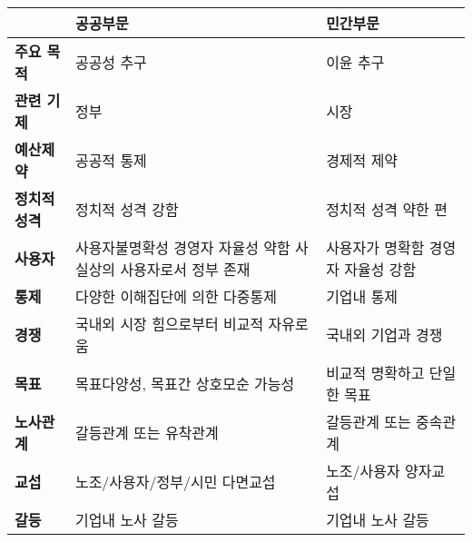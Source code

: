 \begin{tabular}{lp{8cm}p{8cm}}
\toprule
& \textbf{공공부문} & \textbf{민간부문} \\
\midrule
\textbf{주요 목적} & 공공성 추구 & 이윤 추구 \\
\midrule
\textbf{관련 기제} & 정부 & 시장 \\
\midrule
\textbf{예산제약} & 공공적 통제 & 경제적 제약 \\
\midrule
\textbf{정치적 성격} & 정치적 성격 강함 & 정치적 성격 약한 편 \\
\midrule
\textbf{사용자} & 사용자불명확성 \newline 경영자 자율성 약함 \newline 사실상의 사용자로서 정부 존재 & 사용자가 명확함 \newline 경영자 자율성 강함 \newline \\
\midrule
\textbf{통제} & 다양한 이해집단에 의한 다중통제 & 기업내 통제 \\
\midrule
\textbf{경쟁} & 국내외 시장 힘으로부터 비교적 자유로움 & 국내외 기업과 경쟁 \\
\midrule
\textbf{목표} & 목표다양성, 목표간 상호모순 가능성 & 비교적 명확하고 단일한 목표 \\
\midrule
\textbf{노사관계} & 갈등관계 또는 유착관계 & 갈등관계 또는 중속관계 \\
\midrule
\textbf{교섭} & 노조/사용자/정부/시민 다면교섭 & 노조/사용자 양자교섭 \\
\midrule
\textbf{갈등} & 기업내 노사 갈등 & 기업내 노사 갈등 \\
\bottomrule
\end{tabular}

